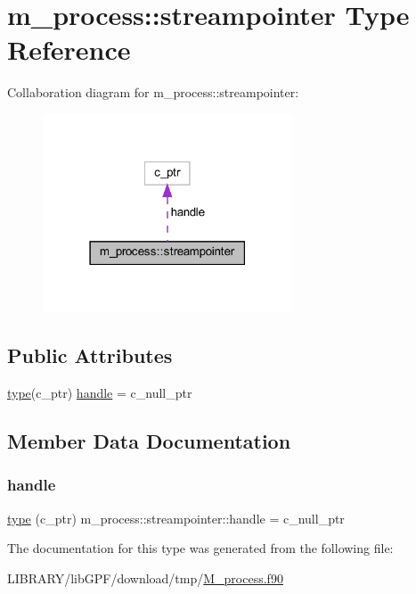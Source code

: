 \hypertarget{structm__process_1_1streampointer}{}\section{m\+\_\+process\+:\+:streampointer Type Reference}
\label{structm__process_1_1streampointer}


Collaboration diagram for m\+\_\+process\+:\+:streampointer\+:
\nopagebreak
\begin{figure}[H]
\begin{center}
\leavevmode
\includegraphics[width=210pt]{structm__process_1_1streampointer__coll__graph}
\end{center}
\end{figure}
\subsection*{Public Attributes}
\begin{DoxyCompactItemize}
\item 
\hyperlink{stop__watch_83_8txt_a70f0ead91c32e25323c03265aa302c1c}{type}(c\+\_\+ptr) \hyperlink{structm__process_1_1streampointer_aaa577914dd36a5ef61670674dd3a194c}{handle} = c\+\_\+null\+\_\+ptr
\end{DoxyCompactItemize}


\subsection{Member Data Documentation}
\mbox{\label{structm__process_1_1streampointer_aaa577914dd36a5ef61670674dd3a194c}} 
\subsubsection{\texorpdfstring{handle}{handle}}
{\footnotesize\ttfamily \hyperlink{stop__watch_83_8txt_a70f0ead91c32e25323c03265aa302c1c}{type} (c\+\_\+ptr) m\+\_\+process\+::streampointer\+::handle = c\+\_\+null\+\_\+ptr}



The documentation for this type was generated from the following file\+:\begin{DoxyCompactItemize}
\item 
L\+I\+B\+R\+A\+R\+Y/lib\+G\+P\+F/download/tmp/\hyperlink{M__process_8f90}{M\+\_\+process.\+f90}\end{DoxyCompactItemize}
